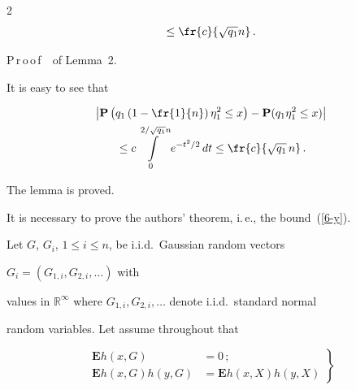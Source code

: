 \begin{multicols}{2}
\begin{equation*}
\leq

\fr{c}{\sqrt{q_1}n}\,.

    \end{equation*} %

   

\smallskip



\noindent

P\,r\,o\,o\,f\ \ of Lemma~2.

    It is easy to see that

\begin{multline*}

\left\vert\mathbf{P}\left(q_1\left(1-\fr{1}{n}\right)\eta_1^{2}\leq x\right)-

\mathbf{P}(q_1\eta_1^{2}\leq

    x)\right\vert\\

    {}\leq c\int\limits_{0}^{2/\sqrt{q_1}n}e^{-t^{2}/2}\,dt\leq \fr{c}{\sqrt{q_1}\,n}\,.

    \end{multline*}

    The lemma is proved.



\columnbreak



It is necessary to prove the authors' theorem, i.\,e., the bound~(\ref{6-y}).

    Let $G$, $G_i$, $1 \leq i \leq n$, be i.i.d.\ Gaussian random vectors

    $G_i =(G_{1,i},G_{2,i},\ldots)$ with

    values in $\mathbb{R}^{\infty}$ where $G_{1,i},G_{2,i},\ldots$ denote i.i.d.\ standard normal

    random variables. Let assume throughout that

\begin{equation}

\left.

\begin{array}{rl}

     \mathbf{E}h(x,G)&=0\,;\\[9pt]

     \mathbf{E}h(x,G)h(y,G)&=\mathbf{E}h(x,X)h(y,X)

    \end{array}

 \right\}

 \label{m}

    \end{equation}


\end{multicols}
